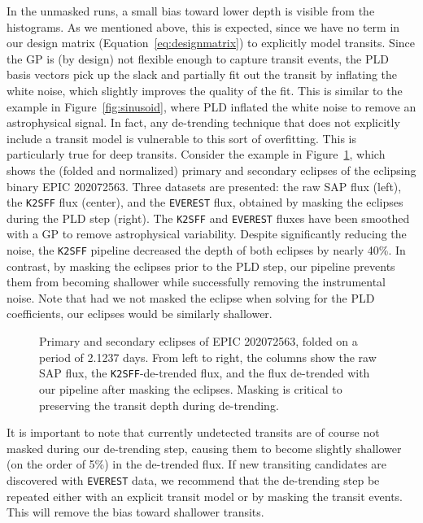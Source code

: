 \documentclass[]{emulateapj}
\begin{document}
In the unmasked runs, a small bias toward lower depth is visible from the histograms.
As we mentioned above, this is expected, since we have no term in our design
matrix (Equation~\ref{eq:designmatrix}) to explicitly model transits. Since the GP
is (by design) not flexible enough to capture transit events, the PLD basis vectors
pick up the slack and partially fit out the transit by inflating the white noise,
which slightly improves the quality of the fit. This is similar to the example in 
Figure~\ref{fig:sinusoid}, where PLD inflated the white noise to remove an astrophysical
signal. In fact, any de-trending technique that does not explicitly include a transit
model is vulnerable to this sort of overfitting. This is particularly true for deep
transits. Consider the example in Figure~\ref{fig:202072563}, which shows the (folded
and normalized) primary and secondary eclipses of the eclipsing binary EPIC 202072563. Three datasets are
presented: the raw SAP flux (left), the \texttt{K2SFF} flux (center), and
the \texttt{EVEREST} flux, obtained by masking the eclipses during the PLD step
(right). The \texttt{K2SFF} and \texttt{EVEREST} fluxes have been smoothed with a GP to 
remove astrophysical variability. Despite significantly reducing the noise, the
\texttt{K2SFF} pipeline decreased the depth of both eclipses by nearly 40\%. In contrast,
by masking the eclipses prior to the PLD step, our pipeline prevents them from becoming
shallower while successfully removing the instrumental noise. Note that had we not
masked the eclipse when solving for the PLD coefficients, our eclipses would be
similarly shallower.

\begin{figure}[h]
  \begin{center}
       \caption{Primary and secondary eclipses of EPIC 202072563, folded
                on a period of 2.1237 days. From left to right, the columns
                show the raw SAP flux, the \texttt{K2SFF}-de-trended flux, and the
                flux de-trended with our pipeline after masking the eclipses. Masking
                is critical to preserving the transit depth during de-trending.}
     \label{fig:202072563}
  \end{center}
\end{figure}

It is important to note that currently undetected transits are of course not masked
during our de-trending step, causing them to become slightly shallower (on the order
of 5\%) in the de-trended flux. If new transiting candidates are discovered with
\texttt{EVEREST} data, we recommend that the de-trending step be repeated either with
an explicit transit model or by masking the transit events. This will remove the bias
toward shallower transits.
\end{document}

